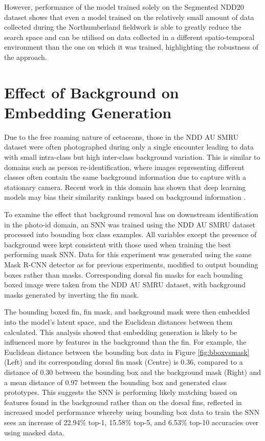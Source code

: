 However, performance of the model trained solely on the Segmented NDD20 dataset shows that even a model trained on the relatively small amount of data collected during the Northumberland fieldwork is able to greatly reduce the search space and can be utilised on data collected in a different spatio-temporal environment than the one on which it was trained, highlighting the robustness of the approach. 

\section{Effect of Background on Embedding Generation}\label{ch:SNNEvaluation,sec:EffectOfNoise}

Due to the free roaming nature of cetaceans, those in the NDD AU SMRU dataset were often photographed during only a single encounter leading to data with small intra-class but high inter-class background variation. This is similar to domains such as person re-identification, where images representing different classes often contain the same background information due to capture with a stationary camera. Recent work in this domain has shown that deep learning models may bias their similarity rankings based on background information \cite{tian_eliminating_2018}. 

To examine the effect that background removal has on downstream identification in the photo-id domain, an SNN was trained using the NDD AU SMRU dataset processed into bounding box class examples. All variables except the presence of background were kept consistent with those used when training the best performing mask SNN. Data for this experiment was generated using the same Mask R-CNN detector as for previous experiments, modified to output bounding boxes rather than masks. Corresponding dorsal fin masks for each bounding boxed image were taken from the NDD AU SMRU dataset, with background masks generated by inverting the fin mask. 

The bounding boxed fin, fin mask, and background mask were then embedded into the model's latent space, and the Euclidean distances between them calculated. This analysis showed that embedding generation is likely to be influenced more by features in the background than the fin. For example, the Euclidean distance between the bounding box data in Figure \ref{fig:bboxvsmask} (Left) and its corresponding dorsal fin mask (Centre) is 0.36, compared to a distance of 0.30 between the bounding box and the background mask (Right) and a mean distance of 0.97 between the bounding box and generated class prototypes. This suggests the SNN is performing likely matching based on features found in the background rather than on the dorsal fins, reflected in increased model performance whereby using bounding box data to train the SNN sees an increase of 22.94\% top-1, 15.58\% top-5, and 6.53\% top-10 accuracies over using masked data.

